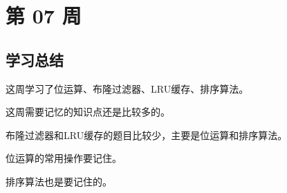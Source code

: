 \newpage
\section{第 07 周}





\subsection{学习总结}

这周学习了位运算、布隆过滤器、LRU缓存、排序算法。

这周需要记忆的知识点还是比较多的。

布隆过滤器和LRU缓存的题目比较少，主要是位运算和排序算法。

位运算的常用操作要记住。

排序算法也是要记住的。
